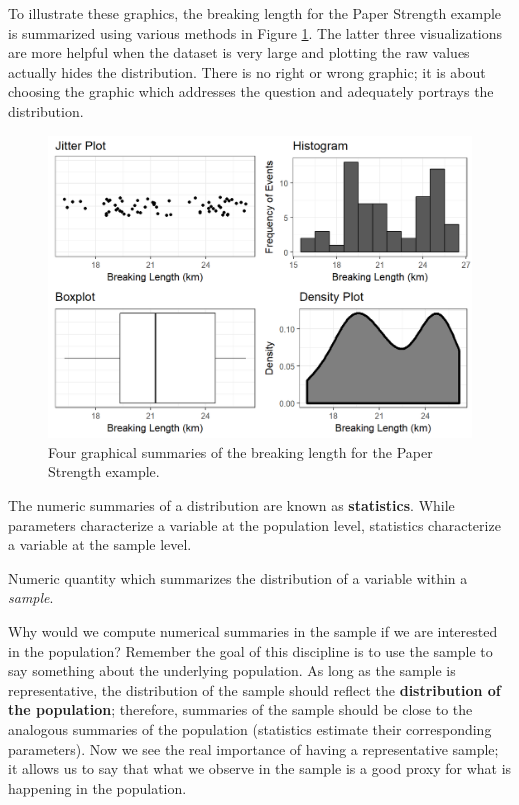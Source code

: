 \documentclass[]{book}
\theoremstyle{plain}
\theoremstyle{mydefn}
\theoremstyle{myexmpl}
\theoremstyle{remark}
\let\BeginKnitrBlock\begin \let\EndKnitrBlock\end
\let\BeginKnitrBlock\begin \let\EndKnitrBlock\end
\begin{document}
To illustrate these graphics, the breaking length for the Paper Strength
example is summarized using various methods in Figure
\ref{fig:summaries-univariate}. The latter three visualizations are more
helpful when the dataset is very large and plotting the raw values
actually hides the distribution. There is no right or wrong graphic; it
is about choosing the graphic which addresses the question and
adequately portrays the distribution.

\begin{figure}

{\centering \includegraphics[width=0.8\linewidth]{./Images/summaries-univariate-1} 

}

\caption{Four graphical summaries of the breaking length for the Paper Strength example.}\label{fig:summaries-univariate}
\end{figure}

The numeric summaries of a distribution are known as
\textbf{statistics}. While parameters characterize a variable at the
population level, statistics characterize a variable at the sample
level.

\BeginKnitrBlock{definition}[Statistic]
\protect\hypertarget{def:defn-statistic}{}{\label{def:defn-statistic}
{} }Numeric quantity which summarizes the
distribution of a variable within a \emph{sample}.
\EndKnitrBlock{definition}

Why would we compute numerical summaries in the sample if we are
interested in the population? Remember the goal of this discipline is to
use the sample to say something about the underlying population. As long
as the sample is representative, the distribution of the sample should
reflect the \textbf{distribution of the population}; therefore,
summaries of the sample should be close to the analogous summaries of
the population (statistics estimate their corresponding parameters). Now
we see the real importance of having a representative sample; it allows
us to say that what we observe in the sample is a good proxy for what is
happening in the population.
\end{document}
